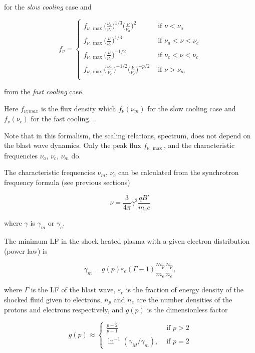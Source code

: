 for the \textit{slow cooling} case and 

\begin{equation}
f_{\nu} = 
\begin{cases}
f_{\nu,\max}\Big(\frac{\nu_a}{\nu_c}\Big)^{1/3}\Big(\frac{\nu}{\nu_a}\Big)^2 & \text{ if } \nu < \nu_a \\
f_{\nu,\max}\Big(\frac{\nu}{\nu_c}\Big)^{1/3} & \text{ if } \nu_a < \nu < \nu_c \\
f_{\nu,\max}\Big(\frac{\nu}{\nu_c}\Big)^{-1/2} & \text{ if } \nu_c < \nu < \nu_c \\
f_{\nu,\max}\Big(\frac{\nu_m}{\nu_c}\Big)^{-1/2}\Big(\frac{\nu}{\nu_c}\Big)^{-p/2} & \text{ if } \nu > \nu_m \\
\end{cases}
\end{equation}

from the \textit{fast cooling} case. 

Here $f_{\nu;max}$ is the flux density which $f_{\nu}(\nu_m)$ for the slow cooling case and $f_{\nu}(\nu_{c})$ for the fast cooling. . 

Note that in this formalism, the scaling relations, spectrum, does not depend on the blast wave dynamics. Only the peak flux $f_{\nu,\max}$, and the characteristic frequencies $\nu_a$, $\nu_c$, $\nu_m$ do. 

The characteristic frequencies $\nu_m$, $\nu_c$ can be calculated from the synchrotron frequency formula (see previous sections)

\begin{equation}
\nu = \frac{3}{4\pi}\gamma^2\frac{qB'}{m_e c}
\end{equation}

where $\gamma$ is $\gamma_{m}$ or $\gamma_c$. 

The minimum \ac{LF} in the shock heated plasma with a given electron distribution (power law) is

\begin{equation}
\gamma_m = g(p) \varepsilon_e (\Gamma - 1) \frac{m_p}{m_e}\frac{n_p}{n_e},
\end{equation}

where $\Gamma$ is the \ac{LF} of the blast wave, $\varepsilon_e$ is the fraction of energy density of the shocked fluid given to electrons, $n_p$ and $n_e$ are the number densities of the protons and electrons respectively, and $g(p)$ is the dimensionless factor

\begin{equation}
g(p) \approx 
\begin{cases}
\frac{p-2}{p-1} & \text{ if } p>2 \\
\ln^{-1}(\gamma_M/\gamma_m), & \text{ if } p = 2
\end{cases}
\end{equation}


